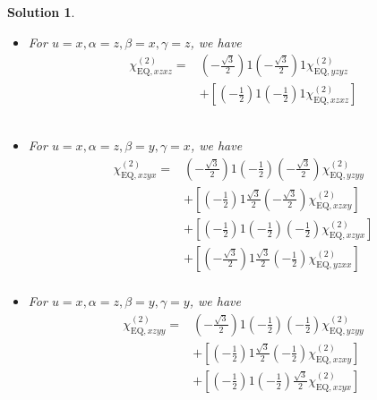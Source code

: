 \documentclass[UTF8,10pt,a4paper]{article}
\theoremstyle{Problem}
\theoremstyle{Solution}
\newtheorem*{sol}{Solution}
\begin{document}
\begin{sol}
\begin{itemize}
\begin{align}
\nonumber&+\left[\left(-\frac{1}{2}\right)1\left(-\frac{\sqrt{3}}{2}\right)\frac{\sqrt{3}}{2}\chi_{\text{EQ},xzyx}^{(2)}\right]\\
\nonumber&+\left[\left(-\frac{\sqrt{3}}{2}\right)1\left(-\frac{1}{2}\right)\frac{\sqrt{3}}{2}\chi_{\text{EQ},yzxx}^{(2)}\right]\\
&
\end{align}\normalsize
\item For $u=x,\alpha=z,\beta=x,\gamma=z$, we have
\footnotesize\begin{align}
\nonumber\chi_{\text{EQ},xzxz}^{(2)}=&\left(-\frac{\sqrt{3}}{2}\right)1\left(-\frac{\sqrt{3}}{2}\right)1\chi_{\text{EQ},yzyz}^{(2)}\\
\nonumber&+\left[\left(-\frac{1}{2}\right)1\left(-\frac{1}{2}\right)1\chi_{\text{EQ},xzxz}^{(2)}\right]\\
\nonumber&\\
\nonumber&\\
&
\end{align}\normalsize
\item For $u=x,\alpha=z,\beta=y,\gamma=x$, we have
\footnotesize\begin{align}
\nonumber\chi_{\text{EQ},xzyx}^{(2)}=&\left(-\frac{\sqrt{3}}{2}\right)1\left(-\frac{1}{2}\right)\left(-\frac{\sqrt{3}}{2}\right)\chi_{\text{EQ},yzyy}^{(2)}\\
\nonumber&+\left[\left(-\frac{1}{2}\right)1\frac{\sqrt{3}}{2}\left(-\frac{\sqrt{3}}{2}\right)\chi_{\text{EQ},xzxy}^{(2)}\right]\\
\nonumber&+\left[\left(-\frac{1}{2}\right)1\left(-\frac{1}{2}\right)\left(-\frac{1}{2}\right)\chi_{\text{EQ},xzyx}^{(2)}\right]\\
\nonumber&+\left[\left(-\frac{\sqrt{3}}{2}\right)1\frac{\sqrt{3}}{2}\left(-\frac{1}{2}\right)\chi_{\text{EQ},yzxx}^{(2)}\right]\\
&
\end{align}\normalsize
\item For $u=x,\alpha=z,\beta=y,\gamma=y$, we have
\footnotesize\begin{align}
\nonumber\chi_{\text{EQ},xzyy}^{(2)}=&\left(-\frac{\sqrt{3}}{2}\right)1\left(-\frac{1}{2}\right)\left(-\frac{1}{2}\right)\chi_{\text{EQ},yzyy}^{(2)}\\
\nonumber&+\left[\left(-\frac{1}{2}\right)1\frac{\sqrt{3}}{2}\left(-\frac{1}{2}\right)\chi_{\text{EQ},xzxy}^{(2)}\right]\\
\nonumber&+\left[\left(-\frac{1}{2}\right)1\left(-\frac{1}{2}\right)\frac{\sqrt{3}}{2}\chi_{\text{EQ},xzyx}^{(2)}\right]\\

\end{align}
\end{itemize}
\end{sol}
\end{document}

